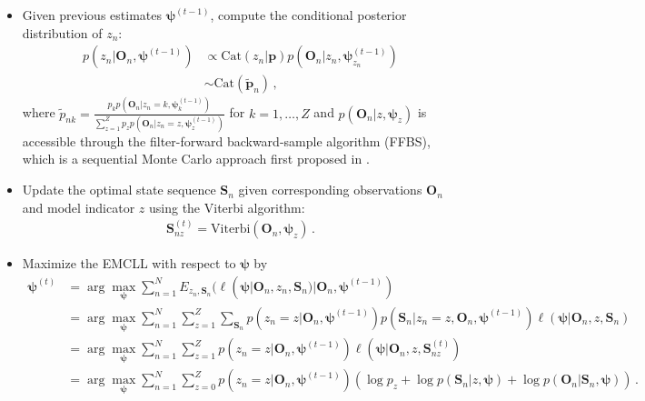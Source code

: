 \documentclass{article}
\begin{document}
\begin{itemize}
	\item Given previous estimates $\bm \psi^{(t-1)}$, compute the conditional posterior distribution of $z_n$:
	\begin{align}
	p(z_n|\bm O_n, \bm \psi^{(t-1)}) & \propto \mathrm{Cat}(z_n|\bm p)p(\bm O_n| z_n, \bm\psi^{(t-1)}_{z_n}) \nonumber \\
	& \sim \mathrm{Cat}(\tilde{\bm p}_n)\,,
	\label{Pos_I}
	\end{align}
	where $\tilde{p}_{nk} = \frac{p_k p(\bm O_n| z_n = k, \bm{\psi}^{(t-1)}_k)}{\sum_{z = 1}^{Z}p_z p(\bm O_n | z_n = z, \bm\psi^{(t-1)}_z)}$ for $k = 1, \ldots, Z$ and $p(\bm O_n | z, \bm \psi_{z})$ is accessible through the filter-forward backward-sample algorithm (FFBS), which is a sequential Monte Carlo approach first proposed in \cite{Kitagawa_1987}.
	\item Update the optimal state sequence $\bm S_n$ given corresponding observations $\bm O_n$ and model indicator $z$ using the Viterbi algorithm: 
	\begin{align}
	\bm S^{(t)}_{nz} = \mathrm{Viterbi}(\bm O_n, \bm \psi_z)\,.
	\label{Pos_S}
	\end{align}
	\item Maximize the EMCLL with respect to $\bm \psi$ by
	\begin{align}
	\bm \psi^{(t)} & = \arg\max\limits_{\bm{\psi}}\sum_{n=1}^{N}E_{z_n, \bm S_n}(\ell(\bm \psi| \bm O_n, z_n, \bm S_n)| \bm O_n, \bm \psi^{(t-1)}) \nonumber \\ 
	& = \arg\max\limits_{\bm{\psi}}\sum_{n = 1}^{N}\sum_{z = 1}^{Z}\sum_{\bm S_n} p(z_n = z| \bm O_n, \bm{\psi}^{(t-1)})  p(\bm S_n |z_n = z, \bm O_n, \bm{\psi}^{(t-1)})\ell(\bm \psi| \bm O_n, z, \bm S_n) \nonumber \\
	& =  \arg\max\limits_{\bm{\psi}} \sum_{n = 1}^{N}\sum_{z = 1}^{Z}p(z_n = z| \bm O_n, \bm \psi^{(t-1)}) \ell(\bm \psi| \bm O_n, z, \bm S^{(t)}_{nz}) \nonumber \\
	& =   \arg\max\limits_{\bm{\psi}} \sum_{n = 1}^{N}\sum_{z = 0}^{Z}p(z_n = z| \bm O_n, \bm \psi^{(t-1)})  \left(\log p_z + \log p(\bm S_n | z, \bm \psi) + \log p(\bm O_n| \bm S_n, \bm \psi) \right)\,.
	\label{M_step}
	\end{align}
\end{itemize}
\end{document}
